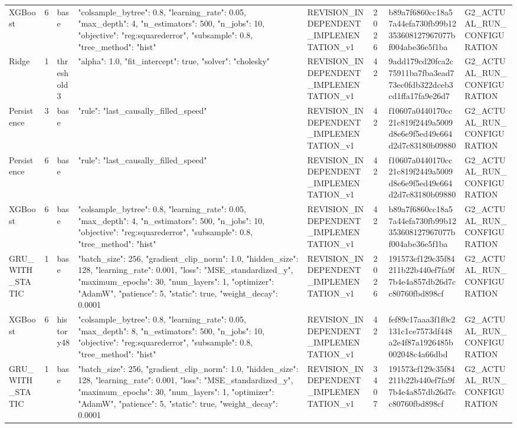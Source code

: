 \begin{longtable}{llllllll}
XGBoost & 6 & base & {"colsample\_bytree": 0.8, "learning\_rate": 0.05, "max\_depth": 4, "n\_estimators": 500, "n\_jobs": 10, "objective": "reg:squarederror", "subsample": 0.8, "tree\_method": "hist"} & REVISION\_INDEPENDENT\_IMPLEMENTATION\_v1 & 2026 & b89a7f6860cc18a57a44efa730fb99b12353608127967077bf004abe36e5f1ba & G2\_ACTUAL\_RUN\_CONFIGURATION \\
Ridge & 1 & threshold3 & {"alpha": 1.0, "fit\_intercept": true, "solver": "cholesky"} & REVISION\_INDEPENDENT\_IMPLEMENTATION\_v1 & 42 & 9add179cd20fca2c75911ba7fba3ead773ec0fdb322dceb3cd1ffa17fa9e26d7 & G2\_ACTUAL\_RUN\_CONFIGURATION \\
Persistence & 3 & base & {"rule": "last\_causally\_filled\_speed"} & REVISION\_INDEPENDENT\_IMPLEMENTATION\_v1 & 42 & f10607a0440170cc21c819f2449a5009d8e6e9f5ed49e664d2d7c83180b09880 & G2\_ACTUAL\_RUN\_CONFIGURATION \\
Persistence & 6 & base & {"rule": "last\_causally\_filled\_speed"} & REVISION\_INDEPENDENT\_IMPLEMENTATION\_v1 & 42 & f10607a0440170cc21c819f2449a5009d8e6e9f5ed49e664d2d7c83180b09880 & G2\_ACTUAL\_RUN\_CONFIGURATION \\
XGBoost & 6 & base & {"colsample\_bytree": 0.8, "learning\_rate": 0.05, "max\_depth": 4, "n\_estimators": 500, "n\_jobs": 10, "objective": "reg:squarederror", "subsample": 0.8, "tree\_method": "hist"} & REVISION\_INDEPENDENT\_IMPLEMENTATION\_v1 & 42 & b89a7f6860cc18a57a44efa730fb99b12353608127967077bf004abe36e5f1ba & G2\_ACTUAL\_RUN\_CONFIGURATION \\
GRU\_WITH\_STATIC & 1 & base & {"batch\_size": 256, "gradient\_clip\_norm": 1.0, "hidden\_size": 128, "learning\_rate": 0.001, "loss": "MSE\_standardized\_y", "maximum\_epochs": 30, "num\_layers": 1, "optimizer": "AdamW", "patience": 5, "static": true, "weight\_decay": 0.0001} & REVISION\_INDEPENDENT\_IMPLEMENTATION\_v1 & 2026 & 191573cf129c35f84211b22b440ef7fa9f7b4e4a857db26d7cc80760fbd898cf & G2\_ACTUAL\_RUN\_CONFIGURATION \\
XGBoost & 6 & history48 & {"colsample\_bytree": 0.8, "learning\_rate": 0.05, "max\_depth": 8, "n\_estimators": 500, "n\_jobs": 10, "objective": "reg:squarederror", "subsample": 0.8, "tree\_method": "hist"} & REVISION\_INDEPENDENT\_IMPLEMENTATION\_v1 & 42 & fef89c17aaa3f1f0c2131c1ce7573df448a2e4f87a1926485b002048c4a66dbd & G2\_ACTUAL\_RUN\_CONFIGURATION \\
GRU\_WITH\_STATIC & 1 & base & {"batch\_size": 256, "gradient\_clip\_norm": 1.0, "hidden\_size": 128, "learning\_rate": 0.001, "loss": "MSE\_standardized\_y", "maximum\_epochs": 30, "num\_layers": 1, "optimizer": "AdamW", "patience": 5, "static": true, "weight\_decay": 0.0001} & REVISION\_INDEPENDENT\_IMPLEMENTATION\_v1 & 3407 & 191573cf129c35f84211b22b440ef7fa9f7b4e4a857db26d7cc80760fbd898cf & G2\_ACTUAL\_RUN\_CONFIGURATION \\

\end{longtable}
